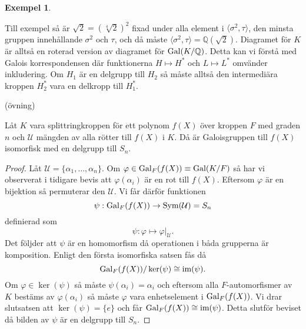 \documentclass{article}
\newcommand{\im}[0]{\textnormal{im}}
\newcommand{\gal}[0]{\textnormal{Gal}}
\theoremstyle{definition}
\newtheorem{exmp}[thm]{Exempel}
\begin{document}
\begin{exmp}
\begin{center}
  \end{center}  
  Till exempel så är $\sqrt{2} = (\sqrt[4]{2})^2$ fixad under alla element 
  i $\langle \sigma^2, \tau \rangle$, den minsta gruppen innehållande $\sigma^2$ och $\tau$, och då måste 
  $\langle \sigma^2, \tau \rangle = \mathbb{Q}(\sqrt{2})$.
  Diagramet för $K$ är alltså en roterad version av diagramet för $\gal(K/\mathbb{Q})$. Detta kan vi förstå med Galois korrespondensen
  där funktionerna $H \mapsto H^*$ och $L \mapsto L^*$ omvänder inkludering. Om $H_1$ är en delgrupp till $H_2$ så måste alltså den intermediära
  kroppen $H_2^*$ vara en delkropp till $H_1^*$.
\end{exmp}

(övning)

\begin{mylemma}{}{}
  Låt $K$ vara splittringkroppen för ett polynom $f(X)$ över kroppen $F$ med graden $n$ och $\mathcal{U}$ mängden av alla rötter till $f(X)$ i $K$. 
  Då är Galoisgruppen till $f(X)$ isomorfisk med en delgrupp till $S_n.$
\end{mylemma}

\begin{proof}
  Låt $\mathcal{U} = \{\alpha_1, \ldots, \alpha_n\}$. Om $\varphi \in \gal_F(f(X)) \equiv \gal(K/F)$ så har vi observerat i tidigare bevis 
  att $\varphi(\alpha_i)$ är en rot till $f(X)$. Eftersom $\varphi$ är en bijektion så permuterar den $\mathcal{U}$. Vi får därför funktionen 
  \[ \psi: \gal_F(f(X)) \rightarrow \textnormal{Sym}(\mathcal{U}) = S_n \]
  definierad som 
  \[\psi: \varphi \mapsto \varphi|_{\mathcal{U}}.\]
  Det följder att $\psi$ är en homomorfism då operationen i båda grupperna är komposition. Enligt den första isomorfiska satsen fås då 
  \[ \gal_F(f(X))/\ker(\psi) \cong \im(\psi). \]
  Om $\varphi \in \ker(\psi)$ så måste $\psi(\alpha_i) = \alpha_i$ och eftersom alla $F$-automorfismer av $K$ bestäms 
  av $\varphi(\alpha_i)$ så måste $\varphi$ vara enhetselement i $\gal_F(f(X))$. Vi drar slutsatsen att $\ker(\psi) = \{e\}$ och får 
  $\gal_F(f(X))\cong \im(\psi)$. Detta slutför beviset då bilden av $\psi$ är en delgrupp till $S_n$.
\end{proof}
\end{document}
